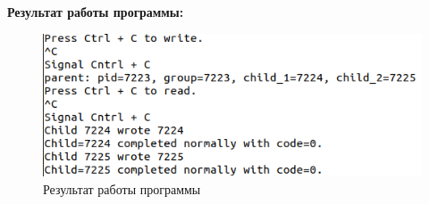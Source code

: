 \documentclass[14pt, a4paper]{extarticle}
\begin{document}
\textbf{Результат работы программы:}\par
\begin{figure}[h!]
	\centering
	\includegraphics[width=\textwidth]{source/5.png}
	\caption{Результат работы программы}
	\label{Example5}
\end{figure}\par
\end{document}
